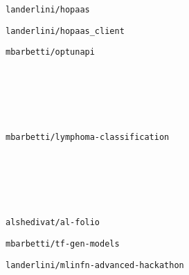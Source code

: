 \begin{cvcontent}
\begin{itemize*}[label=\textcolor{iconcolor}{\textbullet}]
    \item \texttt{landerlini/hopaas} \hfill
      \href{https://hopaas.cloud.infn.it}{\faGlobe}
    \\ [0.5mm]
    \item \texttt{landerlini/hopaas\_client} \hfill
      \href{https://github.com/landerlini/hopaas_client}{\faGithub}
    \\ [0.5mm]
    \item \texttt{mbarbetti/optunapi} \hfill
      \href{https://pypi.org/project/optunapi}{\faPython}
      \href{https://github.com/mbarbetti/optunapi}{\faGithub}
  \end{itemize*}
  \\ [4mm]
  \\ [0.5mm]
  \\ [1.5mm]
  \\ [1.5mm]
  \begin{itemize*}[label=\textcolor{iconcolor}{\textbullet}]
    \item \texttt{mbarbetti/lymphoma-classification} \hfill
      \href{https://github.com/mbarbetti/lymphoma-classification}{\faGithub}
  \end{itemize*}
  \\ [4mm]
  \\ [0.5mm]
  \\ [1.5mm]
  \\ [1.5mm]
  \begin{itemize*}[label=\textcolor{iconcolor}{\textbullet}]
    \item \texttt{alshedivat/al-folio} \hfill
      \href{https://hub.docker.com/r/amirpourmand/al-folio}{\faDocker}
      \href{https://alshedivat.github.io/al-folio}{\faGlobe}
      \href{https://github.com/alshedivat/al-folio}{\faGithub}
    \\ [0.5mm]
    \item \texttt{mbarbetti/tf-gen-models} \hfill
      \href{https://pypi.org/project/tf-gen-models}{\faPython}
      \href{https://github.com/mbarbetti/tf-gen-models}{\faGithub}
    \\ [0.5mm]
    \item \texttt{landerlini/mlinfn-advanced-hackathon} \hfill
      \href{https://github.com/landerlini/mlinfn-advanced-hackathon}{\faGithub}
  \end{itemize*}
\end{cvcontent}